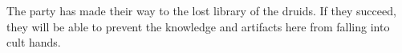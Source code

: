 The party has made their way to the lost library of the druids.
If they succeed, they will be able to prevent the knowledge and artifacts here from falling into cult hands.
